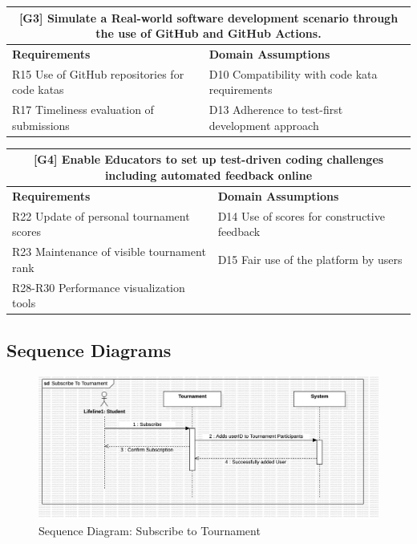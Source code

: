 \begin{longtable}{|p{}|p{}|}
\hline
\multicolumn{2}{|c|}{\begin{minipage}{0.9\textwidth}
\centering
\vspace{5pt}
\textbf{[G3] Simulate a Real-world software development scenario through the use of GitHub and GitHub Actions.}
\vspace{5pt}
\end{minipage}} \\
\hline
\textbf{Requirements} & \textbf{Domain Assumptions} \\
\hline
R15 Use of GitHub repositories for code katas & D10 Compatibility with code kata requirements \\
R17 Timeliness evaluation of submissions & D13 Adherence to test-first development approach \\
\hline
\end{longtable}

\begin{longtable}{|p{}|p{}|}
\hline
\multicolumn{2}{|c|}{\begin{minipage}{0.9\textwidth}
\centering
\vspace{5pt}
\textbf{[G4] Enable Educators to set up test-driven coding challenges including automated feedback online}
\vspace{5pt}
\end{minipage}} \\
\hline
\textbf{Requirements} & \textbf{Domain Assumptions} \\
\hline
R22 Update of personal tournament scores & D14 Use of scores for constructive feedback \\
R23 Maintenance of visible tournament rank & D15 Fair use of the platform by users \\
R28-R30 Performance visualization tools &  \\
\hline
\end{longtable}

\subsection{Sequence Diagrams}

\begin{figure}[Htbp!]
    \centering
    \includegraphics[width=\textwidth]{Graphics/Sequence Diagrams/SubscribeToTournament.png}
    \caption{Sequence Diagram: Subscribe to Tournament}
    \label{fig:Subscribe}
\end{figure}


